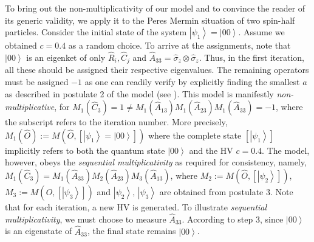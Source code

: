 \documentclass[british,aps,prl,superscriptaddress,nofootinbib,times,reprint]{revtex4-1}
\theoremstyle{plain}
\theoremstyle{plain}
\theoremstyle{definition}
\theoremstyle{remark}
\theoremstyle{remark}
\theoremstyle{remark}
\theoremstyle{plain}
\theoremstyle{plain}
\theoremstyle{plain}
\theoremstyle{definition}
\theoremstyle{definition}
\begin{document}
To bring out the non-multiplicativity of our model 
and to convince the reader of its generic validity,
we apply it to the Peres Mermin situation of two
spin-half particles. Consider the initial state of
the system 
$\left|\psi_{1}\right\rangle
=\left|00\right\rangle $. Assume we 
obtained $c=0.4$ as a random choice. To arrive
at the assignments, note that
$\left|00\right\rangle $ is an eigenket of only
$\hat{R}_{i},\hat{C}_{j}$ and
$\hat{A}_{33}=\hat{\sigma}_{z}\otimes\hat{\sigma}_{z}$.
Thus, in the first iteration, all these should be
assigned their respective eigenvalues. The
remaining operators must be assigned $-1$ as one
can readily verify by explicitly finding the
smallest $a$ as described in postulate 2 of the
model (see ). 
This model is manifestly
\emph{non-multiplicative}, for
$M_{1}(\hat{C}_{3})=1\neq
M_{1}(\hat{A}_{13})M_{1}(\hat{A}_{23})M_{1}(\hat{A}_{33})=-1$,
where the subscript refers to the iteration
number.
More precisely,
$M_{1}(\hat{O}):=M(\hat{O},\left[\left|\psi_{1}\right\rangle
=\left|00\right\rangle \right])$ where the
complete state $\left[\left|\psi_{1}\right\rangle
\right]$ implicitly refers to both the quantum
state $\left|00\right\rangle $ and the HV $c=0.4$.
The model, however, obeys the \emph{sequential
multiplicativity} as required for consistency,
namely,
$M_{1}(\hat{C}_{3})=M_{1}(\hat{A}_{33})M_{2}(\hat{A}_{23})M_{3}(\hat{A}_{13})$,
where
$M_{2}:=M(\hat{O},\left[\left|\psi_{2}\right\rangle
\right])$,
$M_{3}:=M(\hat{O},\left[\left|\psi_{3}\right\rangle
\right])$ and $\left|\psi_{2}\right\rangle
,\,\left|\psi_{3}\right\rangle $ are obtained from
postulate 3. Note that for each iteration, a new
HV is generated. To illustrate \emph{sequential
multiplicativity}, we must choose to measure
$\hat{A}_{33}$. According to step 3, since
$\left|00\right\rangle $ is an eigenstate of
$\hat{A}_{33}$, the final state remains
$\left|00\right\rangle $.  
\end{document}
